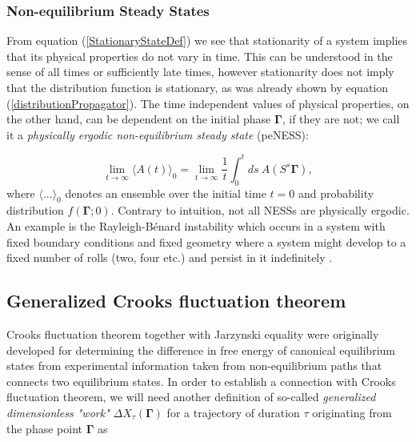 \documentclass[a4paper,12pt]{article}
\begin{document}
\subsubsection{Non-equilibrium Steady States}

From equation (\ref{StationaryStateDef}) we see that stationarity of a system implies that its physical properties do not vary in time. This can be understood in the sense of all times or sufficiently late times, however stationarity does not imply that the distribution function is stationary, as was already shown by equation (\ref{distributionPropagator}).
The time independent values of physical properties, on the other hand, can be dependent on the initial phase $\bm{\Gamma}$, if they are not; we call it a \textit{physically ergodic non-equilibrium steady state} (peNESS):

\begin{equation}
      \lim_{t \to \infty} \langle A(t) \rangle_0 = \lim_{t \to \infty} \frac{1}{t} \int_0^t ds\ A(S^s \bm{\Gamma}),
\end{equation}
 where $\langle ... \rangle_0$ denotes an ensemble over the initial time $t=0$ and probability distribution $f(\bm{\Gamma};0)$.
Contrary to intuition, not all NESSs are physically ergodic. An example is the Rayleigh-Bénard instability which occurs in a system with fixed boundary conditions and fixed geometry where a system might develop to a fixed number of rolls (two, four etc.) and persist in it indefinitely \cite{Evans:2241458}.
\subsection{Generalized Crooks fluctuation theorem}

Crooks fluctuation theorem together with Jarzynski equality were originally developed for determining the difference in free energy of canonical equilibrium states from experimental information taken from non-equilibrium paths that connects two equilibrium states. 
In order to establish a connection with Crooks fluctuation theorem, we will need another definition of so-called \textit{generalized dimensionless "work"} $\Delta X_{\tau}(\bm{\Gamma})$ for a trajectory of duration $\tau$ originating from the phase point $\bm{\Gamma}$ as
\end{document}
